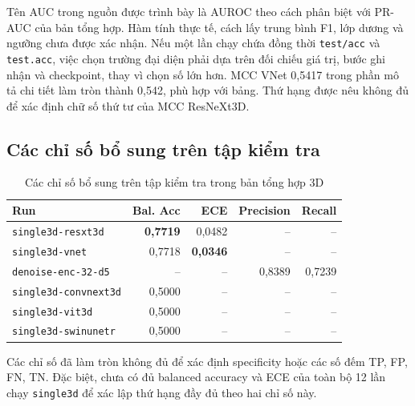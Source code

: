 \documentclass[14pt,a4paper,oneside]{extreport}
\begin{document}
Tên AUC trong nguồn được trình bày là AUROC theo cách phân biệt với
PR-AUC của bản tổng hợp. Hàm tính thực tế, cách lấy trung bình F1,
lớp dương và ngưỡng chưa được xác nhận. Nếu một lần chạy chứa đồng thời
\texttt{test/acc} và \texttt{test.acc}, việc chọn trường đại diện phải dựa
trên đối chiếu giá trị, bước ghi nhận và checkpoint, thay vì chọn số lớn hơn.
MCC VNet 0,5417 trong phần mô tả chi tiết làm tròn thành 0,542, phù hợp
với bảng. Thứ hạng được nêu không đủ để xác định chữ số thứ tư của MCC ResNeXt3D.
\FloatBarrier

\clearpage
\subsection{Các chỉ số bổ sung trên tập kiểm tra}
\begin{table}[htbp]
  \centering
  \caption{Các chỉ số bổ sung trên tập kiểm tra trong bản tổng hợp 3D}
  \label{tab:sweep-3d-extra-test}
  \setlength{\tabcolsep}{4pt}
  \begin{tabular}{@{}lrrrr@{}}
    \toprule Run & Bal. Acc & ECE & Precision & Recall\\ \midrule
    \texttt{single3d-resxt3d} & \textbf{0,7719} & 0,0482 & -- & --\\
    \texttt{single3d-vnet} & 0,7718 & \textbf{0,0346} & -- & --\\
    \texttt{denoise-enc-32-d5} & -- & -- & 0,8389 & 0,7239\\
    \texttt{single3d-convnext3d} & 0,5000 & -- & -- & --\\
    \texttt{single3d-vit3d} & 0,5000 & -- & -- & --\\
    \texttt{single3d-swinunetr} & 0,5000 & -- & -- & --\\
    \bottomrule
  \end{tabular}
  \par{}
\end{table}
Các chỉ số đã làm tròn không đủ để xác định specificity hoặc các số đếm
TP, FP, FN, TN. Đặc biệt, chưa có đủ balanced accuracy và ECE của toàn bộ
12 lần chạy \texttt{single3d} để xác lập thứ hạng đầy đủ theo hai chỉ số này.

\FloatBarrier
\end{document}
